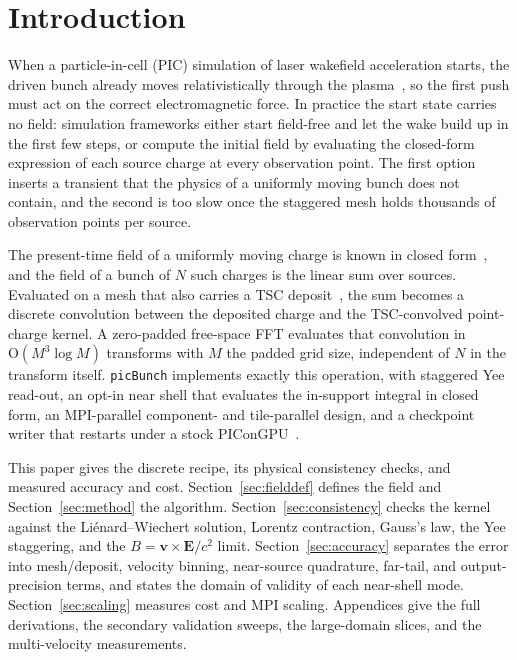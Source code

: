 \section{Introduction}
\label{sec:intro}

When a particle-in-cell (PIC) simulation of laser wakefield acceleration
starts, the driven bunch already moves relativistically through the
plasma~\citep{esarey2009}, so the first push must act on the correct
electromagnetic force. In practice the start state carries no field:
simulation frameworks either start field-free and let the wake build up in
the first few steps, or compute the initial field by evaluating the
closed-form expression of each source charge at every observation point.
The first option inserts a transient that the physics of a uniformly moving
bunch does not contain, and the second is too slow once the staggered mesh
holds thousands of observation points per source.

The present-time field of a uniformly moving charge is known in closed
form~\citep{jackson2007,landau1975}, and the field of a bunch of $N$ such
charges is the linear sum over sources. Evaluated on a mesh that also
carries a TSC deposit~\citep{birdsall1985,hockney1981}, the sum becomes a
discrete convolution between the deposited charge and the TSC-convolved
point-charge kernel. A zero-padded free-space FFT evaluates that
convolution in $\mathrm{O}(M^3\log M)$ transforms with $M$ the padded grid
size, independent of $N$ in the transform itself. \texttt{picBunch}
implements exactly this operation, with staggered Yee read-out, an opt-in
near shell that evaluates the in-support integral in closed form, an
MPI-parallel component- and tile-parallel design, and a checkpoint writer
that restarts under a stock PIConGPU~\citep{burau2010,openpmd}.

This paper gives the discrete recipe, its physical consistency checks, and
measured accuracy and cost. Section~\ref{sec:fielddef} defines the field
and Section~\ref{sec:method} the algorithm. Section~\ref{sec:consistency}
checks the kernel against the Li\'enard--Wiechert solution, Lorentz
contraction, Gauss's law, the Yee staggering, and the
$B = \boldsymbol{v}\times\boldsymbol{E}/c^2$ limit.
Section~\ref{sec:accuracy} separates the error into mesh/deposit, velocity
binning, near-source quadrature, far-tail, and output-precision terms, and
states the domain of validity of each near-shell mode.
Section~\ref{sec:scaling} measures cost and MPI scaling.
Appendices give the full derivations, the secondary validation sweeps, the
large-domain slices, and the multi-velocity measurements.
